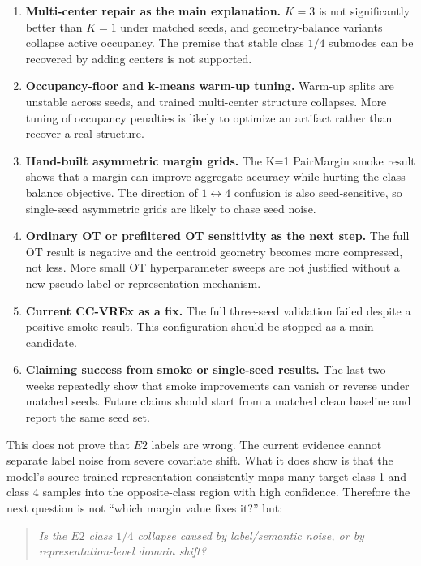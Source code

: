 \documentclass[11pt]{article}
\begin{document}
\begin{enumerate}[leftmargin=*]
    \item \textbf{Multi-center repair as the main explanation.} $K=3$ is not significantly better than $K=1$ under matched seeds, and geometry-balance variants collapse active occupancy. The premise that stable class $1/4$ submodes can be recovered by adding centers is not supported.

    \item \textbf{Occupancy-floor and k-means warm-up tuning.} Warm-up splits are unstable across seeds, and trained multi-center structure collapses. More tuning of occupancy penalties is likely to optimize an artifact rather than recover a real structure.

    \item \textbf{Hand-built asymmetric margin grids.} The K=1 PairMargin smoke result shows that a margin can improve aggregate accuracy while hurting the class-balance objective. The direction of $1\leftrightarrow4$ confusion is also seed-sensitive, so single-seed asymmetric grids are likely to chase seed noise.

    \item \textbf{Ordinary OT or prefiltered OT sensitivity as the next step.} The full OT result is negative and the centroid geometry becomes more compressed, not less. More small OT hyperparameter sweeps are not justified without a new pseudo-label or representation mechanism.

    \item \textbf{Current CC-VREx as a fix.} The full three-seed validation failed despite a positive smoke result. This configuration should be stopped as a main candidate.

    \item \textbf{Claiming success from smoke or single-seed results.} The last two weeks repeatedly show that smoke improvements can vanish or reverse under matched seeds. Future claims should start from a matched clean baseline and report the same seed set.
\end{enumerate}

This does not prove that $E2$ labels are wrong. The current evidence cannot separate label noise from severe covariate shift. What it does show is that the model's source-trained representation consistently maps many target class 1 and class 4 samples into the opposite-class region with high confidence. Therefore the next question is not ``which margin value fixes it?'' but:
\begin{quote}
\emph{Is the $E2$ class $1/4$ collapse caused by label/semantic noise, or by representation-level domain shift?}
\end{quote}
\end{document}
